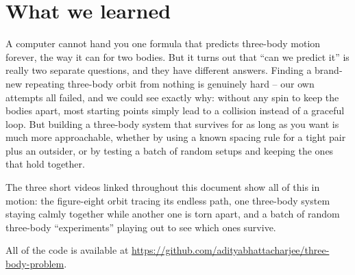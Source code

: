 \documentclass[11pt]{article}
\begin{document}
\section{What we learned}

A computer cannot hand you one formula that predicts three-body motion
forever, the way it can for two bodies. But it turns out that ``can we
predict it'' is really two separate questions, and they have different
answers. Finding a brand-new repeating three-body orbit from nothing is
genuinely hard -- our own attempts all failed, and we could see exactly
why: without any spin to keep the bodies apart, most starting points
simply lead to a collision instead of a graceful loop. But building a
three-body system that survives for as long as you want is much more
approachable, whether by using a known spacing rule for a tight pair plus
an outsider, or by testing a batch of random setups and keeping the ones
that hold together.

The three short videos linked throughout this document show all of this
in motion: the figure-eight orbit tracing its endless path, one
three-body system staying calmly together while another one is torn
apart, and a batch of random three-body ``experiments'' playing out to
see which ones survive.

All of the code is available at
\url{https://github.com/adityabhattacharjee/three-body-problem}.



\end{document}
